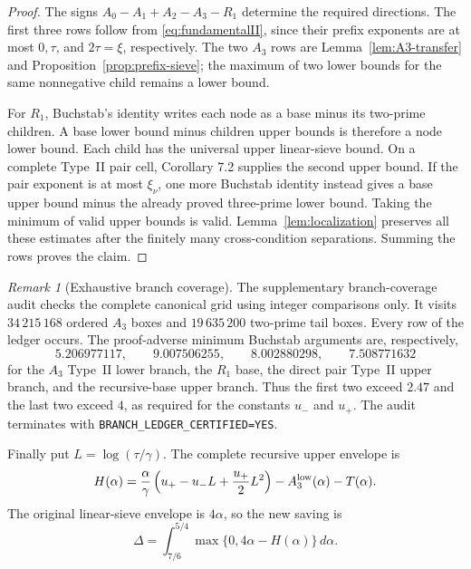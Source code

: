 \documentclass[10pt,reqno]{amsart}
\newcommand{\1}{\mathbf{1}}
\theoremstyle{plain}
\theoremstyle{remark}
\newtheorem{remark}[theorem]{Remark}
\begin{document}
\begin{proof}
The signs $A_0-A_1+A_2-A_3-R_1$ determine the required directions.  The
first three rows follow from \eqref{eq:fundamentalII}, since their prefix
exponents are at most $0,\tau$, and $2\tau=\xi$, respectively.  The two
$A_3$ rows are Lemma~\ref{lem:A3-transfer} and
Proposition~\ref{prop:prefix-sieve}; the maximum of two lower bounds for the
same nonnegative child remains a lower bound.

For $R_1$, Buchstab's identity writes each node as a base minus its
two-prime children.  A base lower bound minus children upper bounds is
therefore a node lower bound.  Each child has the universal upper
linear-sieve bound.  On a complete Type~II pair cell, Corollary 7.2 supplies
the second upper bound.  If the pair exponent is at most $\xi_\nu$, one
more Buchstab identity instead gives a base upper bound minus the already
proved three-prime lower bound.  Taking the minimum of valid upper bounds
is valid.  Lemma~\ref{lem:localization} preserves all these estimates after
the finitely many cross-condition separations.  Summing the rows proves the
claim.
\end{proof}

\begin{remark}[Exhaustive branch coverage]\label{rem:branch-coverage}
The supplementary branch-coverage audit checks the complete canonical grid
using integer comparisons only.  It visits $34\,215\,168$
ordered $A_3$ boxes and $19\,635\,200$ two-prime tail boxes.  Every row of
the ledger occurs.  The proof-adverse minimum Buchstab arguments are,
respectively,
\[
 5.206977117,\qquad 9.007506255,\qquad
 8.002880298,\qquad 7.508771632
\]
for the $A_3$ Type~II lower branch, the $R_1$ base, the direct pair
Type~II upper branch, and the recursive-base upper branch.  Thus the first
two exceed $2.47$ and the last two exceed $4$, as required for the constants
$u_-$ and $u_+$.  The audit terminates with
\texttt{BRANCH\_LEDGER\_CERTIFIED=YES}.
\end{remark}

Finally put $L=\log(\tau/\gamma)$.  The complete recursive upper envelope is
\begin{equation}\label{eq:H}
 H(\alpha)=\frac{\alpha}{\gamma}
 \left(u_+-u_-L+\frac{u_+}{2}L^2\right)
 -A_3^{\rm low}(\alpha)-T(\alpha).
\end{equation}
The original linear-sieve envelope is $4\alpha$, so the new saving is
\begin{equation}\label{eq:Delta}
 \Delta=\int_{7/6}^{5/4}
 \max\{0,4\alpha-H(\alpha)\}\,d\alpha.
\end{equation}
\end{document}
